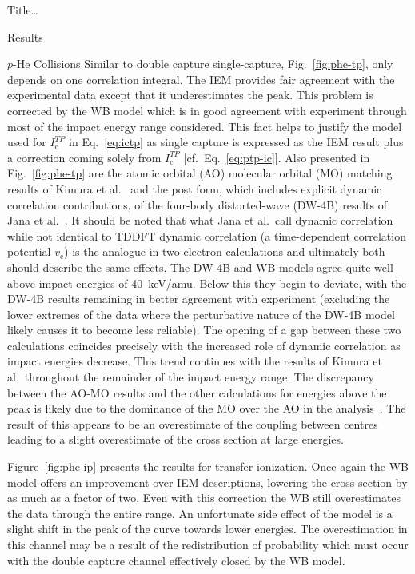 \documentclass[letterpaper, 11 pt]{report}
\begin{document}
\begin{chapter}{ Title\dots \label{chap:p-he2p-he}}
\begin{section}{Results \label{sec:phe2p-res}}
\begin{subsection}{\texorpdfstring{$p$}{p}-He Collisions \label{sec:phe-res}}
         Similar to double capture single-capture, Fig.~\ref{fig:phe-tp}, only depends on one
         correlation integral. The IEM provides fair agreement with the experimental data except that it
         underestimates the peak. This problem is corrected by the WB model which is in good agreement
         with experiment through most of the impact energy range considered. This fact helps to justify
         the model used for $I^{TP}_\mathrm{c}$ in Eq.~\eqref{eq:ictp} as single capture is expressed
         as the IEM result plus a correction coming solely from $I^{TP}_\mathrm{c}$
         [cf.\ Eq.~\eqref{eq:ptp-ic}]. Also presented in Fig.~\ref{fig:phe-tp} are the atomic orbital
         (AO) molecular orbital (MO) matching results of Kimura et al.~\cite{KL-86} and the
         post form, which includes explicit dynamic correlation contributions, of the four-body
         distorted-wave (DW-4B) results of Jana et al.~\cite{JMP-15}. It should be noted that
         what Jana et al.\ call dynamic correlation while not identical to TDDFT dynamic
         correlation (a time-dependent correlation potential $v_\mathrm{c}$) is the analogue in
         two-electron calculations and ultimately both should describe the same effects. The DW-4B and
         WB models agree quite well above impact energies of 40~keV/amu. Below this they begin to
         deviate, with the DW-4B results remaining in better agreement with experiment (excluding the
         lower extremes of the data where the perturbative nature of the DW-4B model likely causes it to
         become less reliable). The opening of a gap between these two calculations coincides precisely
         with the increased role of dynamic correlation as impact energies decrease. This trend
         continues with the results of Kimura et al.\ throughout the remainder of the impact
         energy range. The discrepancy between the AO-MO results and the other calculations for energies
         above the peak is likely due to the dominance of the MO over the AO in the
         analysis~\cite{KL-86}. The result of this appears to be an overestimate of the coupling between
         centres leading to a slight overestimate of the cross section at large energies.

         Figure~\ref{fig:phe-ip} presents the results for transfer ionization. Once again the WB model
         offers an improvement over IEM descriptions, lowering the cross section by as much as a factor
         of two. Even with this correction the WB still overestimates the data through the entire range.
         An unfortunate side effect of the model is a slight shift in the peak of the curve towards
         lower energies. The overestimation in this channel may be a result of the redistribution of
         probability which must occur with the double capture channel effectively closed by the WB
         model.
         

\end{subsection}
\end{section}
\end{chapter}
\end{document}
